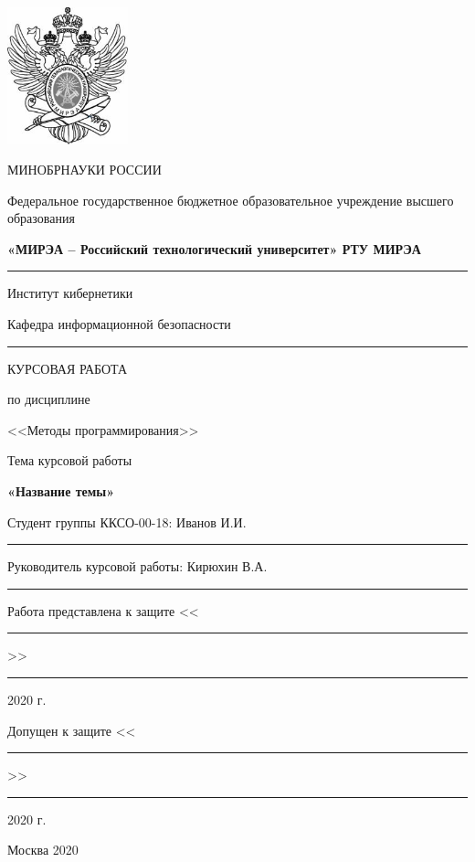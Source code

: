 \documentclass[14pt,russian]{extarticle}
\begin{document}
\begin{center}
\thispagestyle{empty} 

\begin{spacing}{1}

\includegraphics[width=35mm]{logo.jpg} 

{

{МИНОБРНАУКИ РОССИИ}

{Федеральное государственное бюджетное образовательное \linebreak учреждение высшего образования}

{
{\bf «МИРЭА – Российский технологический университет» \linebreak РТУ МИРЭА}
}
\rule{1\columnwidth}{1pt}
{Институт кибернетики \smallskip}

{Кафедра информационной безопасности}
\rule{1\columnwidth}{1pt}

}

\end{spacing}

\vspace{1.5cm}

{
КУРСОВАЯ РАБОТА

по дисциплине

<<Методы программирования>>
}

\vspace{0.5cm}

{
Тема курсовой работы

\large\bf
«Название темы»
}

\vspace{1.5cm}

\begin{flushleft}
Студент группы ККСО-00-18: Иванов И.И. \rule{4cm}{0.5pt}

\vspace{1cm}

Руководитель курсовой работы: Кирюхин В.А. \rule{4cm}{0.5pt}

\vspace{1cm}

Работа представлена к защите <<\rule{1cm}{0.5pt}>> \rule{2cm}{0.5pt} 2020 г.

\vspace{1cm}

Допущен к защите <<\rule{1cm}{0.5pt}>> \rule{2cm}{0.5pt} 2020 г.
\end{flushleft}


\vspace{1.5cm}

{Москва 2020}

\end{center}
\end{document}
